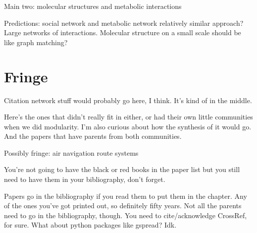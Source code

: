 \documentclass[12pt]{thesis}
\theoremstyle{plain}
\theoremstyle{definition}
\theoremstyle{remark}
\begin{document}
Main two: molecular structures and metabolic interactions

Predictions: social network and metabolic network relatively similar approach? Large networks of interactions. Molecular structure on a small scale should be like graph matching? 

\chapter{Fringe}

Citation network stuff would probably go here, I think. It's kind of in the middle.

Here's the ones that didn't really fit in either, or had their own little communities when we did modularity. I'm also curious about how the synthesis of it would go. And the papers that have parents from both communities.

Possibly fringe: air navigation route systems

You're not going to have the black or red books in the paper list but you still need to have them in your bibliography, don't forget.

Papers go in the bibliography if you read them to put them in the chapter. Any of the ones you've got printed out, so definitely fifty years. Not all the parents need to go in the bibliography, though. You need to cite/acknowledge CrossRef, for sure. What about python packages like gspread? Idk.

\appendix




\printindex
\end{document}
